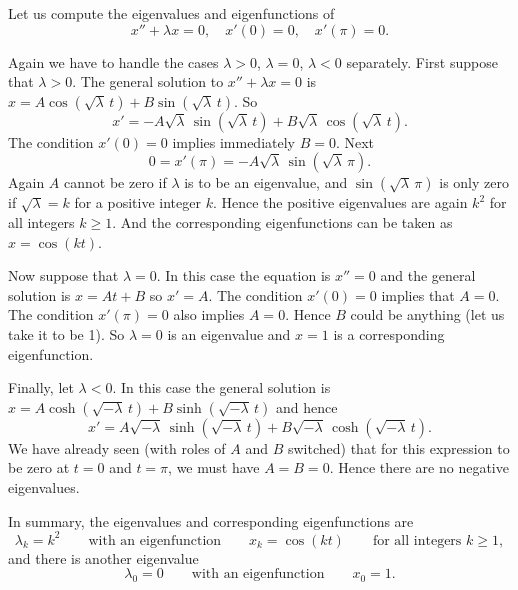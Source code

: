 \begin{example}
Let us compute the 
 eigenvalues and eigenfunctions of
\begin{equation*}
x'' + \lambda x = 0, \quad x'(0) = 0, \quad x'(\pi) = 0 .
\end{equation*}

Again we have to handle the cases $\lambda > 0$, $\lambda = 0$, $\lambda
< 0$ separately.
First suppose that $\lambda > 0$.
The general solution to $x''+\lambda x = 0$ is
$x = A \cos (\! \sqrt{\lambda}\, t) + B \sin (\! \sqrt{\lambda}\, t)$.  So
\begin{equation*}
x' = -A\sqrt{\lambda}\, \sin (\! \sqrt{\lambda}\, t) + B\sqrt{\lambda}\,
\cos (\!\sqrt{\lambda}\, t) .
\end{equation*}
The condition $x'(0) = 0$ implies immediately $B = 0$.
Next
\begin{equation*}
0 = x'(\pi) = -A\sqrt{\lambda}\, \sin (\! \sqrt{\lambda}\, \pi) .
\end{equation*}
Again $A$ cannot be zero if $\lambda$ is to be an eigenvalue,
and $\sin (\! \sqrt{\lambda}\, \pi)$ is only zero
if
$\sqrt{\lambda} = k$ for a positive integer $k$.
Hence the positive eigenvalues are again
$k^2$ for all integers $k \geq 1$.  And the corresponding eigenfunctions
can be taken as $x=\cos (k t)$.

Now suppose that $\lambda = 0$.  In this case the equation is $x'' = 0$
and the general solution is $x = At + B$ so $x' = A$.  The condition
$x'(0) = 0$ implies that
$A=0$.  The condition $x'(\pi) = 0$ also implies $A=0$.
Hence $B$ could be anything (let us take it to be 1).  So $\lambda = 0$
is an eigenvalue and $x=1$ is a corresponding eigenfunction.

Finally, let $\lambda < 0$.  In this case the general solution is
$x = A \cosh (\! \sqrt{-\lambda}\, t) + B \sinh (\! \sqrt{-\lambda}\, t)$
and hence
\begin{equation*}
x' = A\sqrt{-\lambda}\, \sinh (\! \sqrt{-\lambda}\, t)
+ B\sqrt{-\lambda}\, \cosh (\! \sqrt{-\lambda}\, t ) .
\end{equation*}
We have already seen (with roles of $A$ and $B$ switched) that for this
expression to be zero at $t=0$ and $t=\pi$, we must have $A=B=0$.  Hence there are
no negative eigenvalues.

In summary, the eigenvalues and corresponding eigenfunctions are
\begin{equation*}
\lambda_k = k^2 \qquad \text{with an eigenfunction} \qquad x_k = \cos (k t)
\qquad \text{for all integers } k \geq 1 ,
\end{equation*}
and there is another eigenvalue
\begin{equation*}
\lambda_0 = 0 \qquad \text{with an eigenfunction} \qquad x_0 = 1.
\end{equation*}
\end{example}

